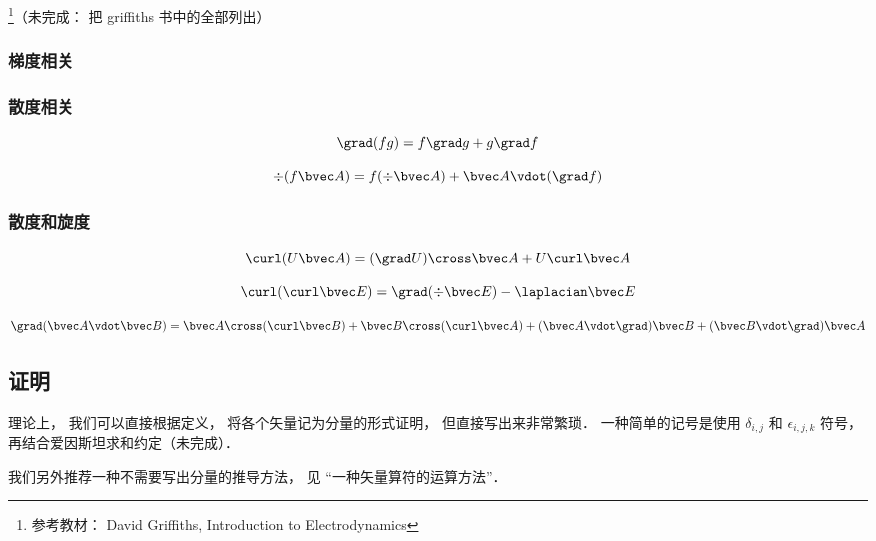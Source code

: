 
\footnote{参考教材： David Griffiths, Introduction to Electrodynamics}（未完成： 把 griffiths 书中的全部列出）

\subsubsection{梯度相关}

\subsubsection{散度相关}
\begin{equation}
\grad (fg) = f\grad g + g \grad f
\end{equation}



\begin{equation}
\div (f \bvec A) = f (\div \bvec A) + \bvec A \vdot (\grad f)
\end{equation}

\subsubsection{散度和旋度}
\begin{equation}
\curl(U\bvec A) = (\grad U) \cross\bvec A + U \curl\bvec A
\end{equation}

\begin{equation}
\curl(\curl \bvec E) = \grad(\div\bvec E) - \laplacian \bvec E
\end{equation}

\begin{equation}
\grad (\bvec A \vdot \bvec B) = \bvec A \cross (\curl \bvec B) + \bvec B \cross (\curl \bvec A) + (\bvec A \vdot \grad) \bvec B + (\bvec B \vdot \grad) \bvec A
\end{equation}

\subsection{证明}
理论上， 我们可以直接根据定义， 将各个矢量记为分量的形式证明， 但直接写出来非常繁琐． 一种简单的记号是使用 $\delta_{i,j}$ 和 $\epsilon_{i,j,k}$ 符号， 再结合爱因斯坦求和约定（未完成）．

我们另外推荐一种不需要写出分量的推导方法， 见 “一种矢量算符的运算方法”．
